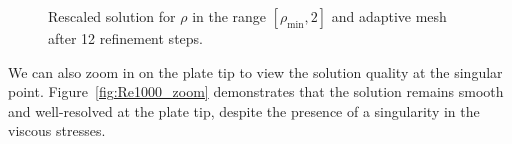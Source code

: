 \begin{figure}
\centering
{}
\caption{Rescaled solution for $\rho$ in the range $[\rho_{\min},2]$ and adaptive mesh after 12 refinement steps.}
\label{fig:rhoScaled}
\end{figure}

We can also zoom in on the plate tip to view the solution quality at the singular point.  Figure~\ref{fig:Re1000_zoom} demonstrates that the solution remains smooth and well-resolved at the plate tip, despite the presence of a singularity in the viscous stresses.%

